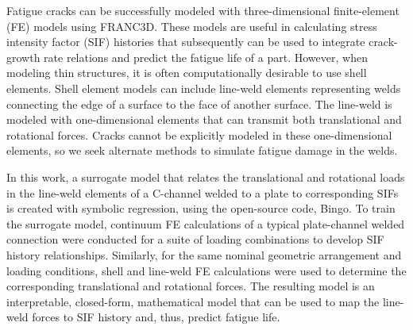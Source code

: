 
Fatigue cracks can be successfully modeled with three-dimensional finite-element (FE) models using FRANC3D. These models are useful in calculating stress intensity factor (SIF) histories that subsequently can be used to integrate crack-growth rate relations and predict the fatigue life of a part. However, when modeling thin structures, it is often computationally desirable to use shell elements. Shell element models can include line-weld elements representing welds connecting the edge of a surface to the face of another surface. The line-weld is modeled with one-dimensional elements that can transmit both translational and rotational forces. Cracks cannot be explicitly modeled in these one-dimensional elements, so we seek alternate methods to simulate fatigue damage in the welds. 

In this work, a surrogate model that relates the translational and rotational loads in the line-weld elements of a C-channel welded to a plate to corresponding SIFs is created with symbolic regression, using the open-source code, Bingo. To train the surrogate model, continuum FE calculations of a typical plate-channel welded connection were conducted for a suite of loading combinations to develop SIF history relationships. Similarly, for the same nominal geometric arrangement and loading conditions, shell and line-weld FE calculations were used to determine the corresponding translational and rotational forces. The resulting model is an interpretable, closed-form, mathematical model that can be used to map the line-weld forces to SIF history and, thus, predict fatigue life. 

